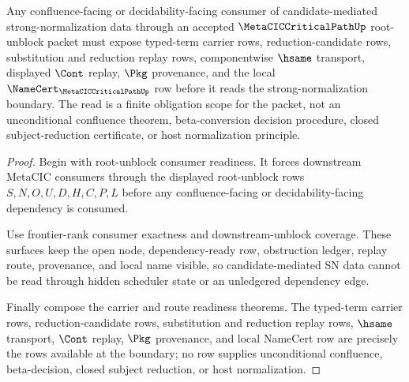 \begin{theorem}
\label{thm:metacic-critical-path-candidate-mediated-sn-scope}
Any confluence-facing or decidability-facing consumer of candidate-mediated strong-normalization data through an accepted $\MetaCICCriticalPathUp$ root-unblock packet must expose typed-term carrier rows, reduction-candidate rows, substitution and reduction replay rows, componentwise $\hsame$ transport, displayed $\Cont$ replay, $\Pkg$ provenance, and the local $\NameCert_{\MetaCICCriticalPathUp}$ row before it reads the strong-normalization boundary. The read is a finite obligation scope for the packet, not an unconditional confluence theorem, beta-conversion decision procedure, closed subject-reduction certificate, or host normalization principle.
\end{theorem}
\begin{proof}
Begin with root-unblock consumer readiness. It forces downstream MetaCIC consumers through the displayed root-unblock rows $S,N,O,U,D,H,C,P,L$ before any confluence-facing or decidability-facing dependency is consumed.

Use frontier-rank consumer exactness and downstream-unblock coverage. These surfaces keep the open node, dependency-ready row, obstruction ledger, replay route, provenance, and local name visible, so candidate-mediated SN data cannot be read through hidden scheduler state or an unledgered dependency edge.

Finally compose the carrier and route readiness theorems. The typed-term carrier rows, reduction-candidate rows, substitution and reduction replay rows, $\hsame$ transport, $\Cont$ replay, $\Pkg$ provenance, and local NameCert row are precisely the rows available at the boundary; no row supplies unconditional confluence, beta-decision, closed subject reduction, or host normalization.
\end{proof}
